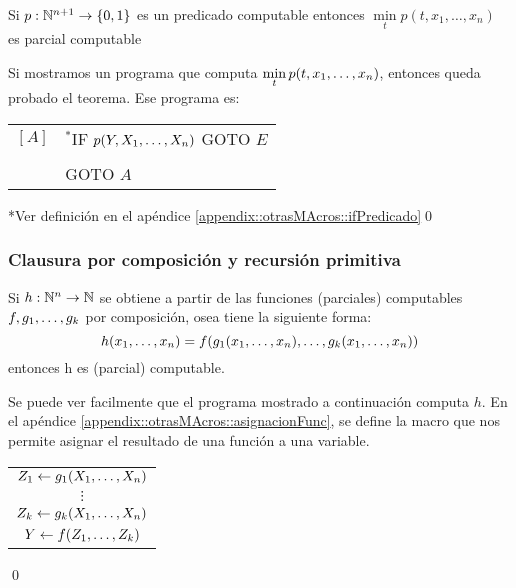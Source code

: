 		\begin{teorema}\label{teorema::MinNoAcotadoEsComputable}
Si $p:\mathbb{N}^{n+1}\to\{0,1\}$ es un predicado computable entonces $\min\limits_t p(t,x_1,\dots,x_n)$ es parcial computable
	\end{teorema}
	
	\begin{demo}
		Si mostramos un programa que computa $\min\limits_t p(t,x_1,\dots, x_{n})$, entonces queda probado el teorema. Ese programa es:
		
		\vspace*{5mm}
		\begin{center}
		\begin{tabular}{ll}
	$[A]$ & $^*$IF $p(Y,X_1,\dots, X_{n})$ GOTO $E$ \\
	& \sincr{Y} \\
	& GOTO $A$
\end{tabular}
		\end{center}
	
	\vspace*{5mm}
	*Ver definición en el apéndice \ref{appendix::otrasMAcros::ifPredicado}\qed
	\end{demo}

\subsubsection{Clausura por composición y recursión primitiva}

\begin{teorema}\label{teorema::computableClausuraComposicion}
Si $h:\mathbb{N}^n\to\mathbb{N}$ se obtiene a partir de las funciones (parciales) computables $f,g_1,\dots, g_{k}$ por composición, osea tiene la siguiente forma:
	$$h(x_1,\dots, x_{n}) = f(g_1(x_1,\dots, x_{n}),\dots,g_k(x_1,\dots, x_{n}))$$
entonces h es (parcial) computable.
\end{teorema}

\begin{demo}
	Se puede  ver facilmente que el programa mostrado a continuación computa $h$. En el apéndice \ref{appendix::otrasMAcros::asignacionFunc}, se define la macro que nos permite asignar el resultado de una función a una variable.
	
	\begin{center}
	\begin{tabular}{c}
		$Z_1 \leftarrow g_1(X_1,\dots, X_{n})$ \\
		$\vdots$ \\
		$Z_k \leftarrow g_k(X_1,\dots, X_{n})$ \\
		$Y \leftarrow f(Z_1,\dots, Z_{k})$\\
	\end{tabular}
\end{center}\qed
\end{demo}

